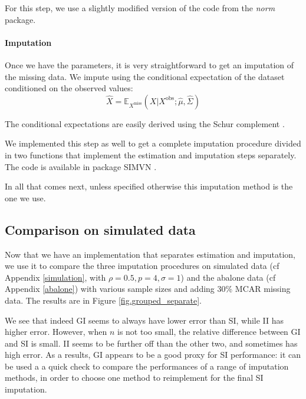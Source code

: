  For this step, we use a slightly modified version of the code from the \emph{norm} package.

\paragraph{Imputation}
Once we have the parameters, it is very straightforward to get an imputation of the missing data. We impute using the conditional expectation of the dataset conditioned on the observed values: 
$$\hat{X} = \mathbb{E}_{X^{\text{miss}}}(X \vert X^{\text{obs}} ; \hat{\mu}, \hat{\Sigma})$$

The conditional expectations are easily derived using the Schur complement \cite{norm_schur}.

We implemented this step as well to get a complete imputation procedure divided in two functions that implement the estimation and imputation steps separately. The code is available in package SIMVN \cite{SIMVN_github}.

In all that comes next, unless specified otherwise this imputation method is the one we use.
		\subsection{Comparison on simulated data}
Now that we have an implementation that separates estimation and imputation, we use it to compare the three imputation procedures on simulated data (cf Appendix \ref{simulation}, with $\rho=0.5, p=4, \sigma=1$) and the abalone data (cf Appendix \ref{abalone}) with various sample sizes and adding 30\% MCAR missing data. The results are in Figure \ref{fig.grouped_separate}.


	
We see that indeed GI seems to always have lower error than SI, while II has higher error. However, when $n$ is not too small, the relative difference between GI and SI is small. II seems to be further off than the other two, and sometimes has high error. As a results, GI appears to be a good proxy for SI performance: it can be used a a quick check to compare the performances of a range of imputation methods, in order to choose one method to reimplement for the final SI imputation.